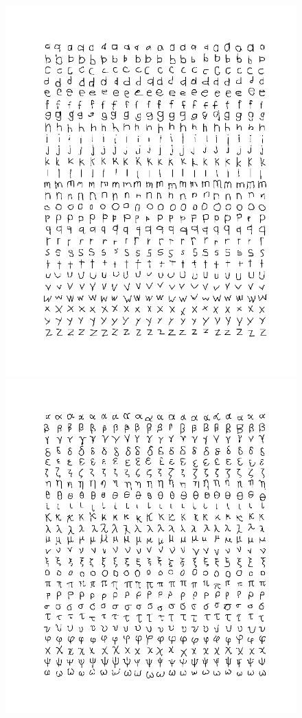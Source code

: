 \begin{figure}[h]
\centering
\begin{minipage}{.3\textwidth}
  \centering
  \includegraphics[width=\linewidth]{images/latin}
\end{minipage}
\begin{minipage}{.3\textwidth}
  \centering
  \includegraphics[width=\linewidth]{images/greek}

\end{minipage}
\end{figure}
